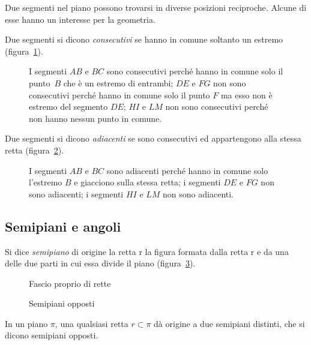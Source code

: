 Due segmenti nel piano possono trovarsi in diverse posizioni reciproche. Alcune di esse hanno un interesse per la geometria.
\begin{definizione}
Due segmenti si dicono \emph{consecutivi} se hanno in comune soltanto un estremo (figura~\ref{fig:1.14}).
\end{definizione}
\begin{figure}[b,t,h]
 \centering 
 \caption{I segmenti $ AB $ e $ BC $ sono consecutivi perché hanno in comune solo il punto~$ B $ che è un estremo di entrambi; $ DE $ e $ FG $ non sono consecutivi perché hanno in comune solo il punto $ F $ ma esso non è estremo del segmento $ DE $; $ HI $ e $ LM $ non sono consecutivi perché non hanno nessun punto in comune.}\label{fig:1.14}
\end{figure}

\begin{definizione}
Due segmenti si dicono \emph{adiacenti} se sono consecutivi ed appartengono alla stessa retta (figura~\ref{fig:1.15}).
\end{definizione}
\begin{figure}[t,b,h]
 \centering 
 \caption{I segmenti $ AB $ e $ BC $ sono adiacenti perché hanno in comune solo l'estremo $ B $ e giacciono sulla stessa retta; i segmenti $ DE $ e $ FG $ non sono adiacenti; i segmenti $ HI $ e $ LM $ non sono adiacenti.}\label{fig:1.15}
\end{figure}

\subsection{Semipiani e angoli}

\begin{definizione}
Si dice \emph{semipiano} di origine la retta r la figura formata dalla retta r e da una delle due parti in cui essa divide il piano (figura~\ref{fig:1.17}).
\end{definizione}
\begin{figure}[b,t,h]
 \begin{minipage}[b]{.40\textwidth}
 \centering
 \caption{Fascio proprio di rette}\label{fig:1.16}
 \end{minipage}\hfil
 \begin{minipage}[b]{.40\textwidth}
 \centering
  \caption{Semipiani opposti}\label{fig:1.17}
  \end{minipage}
\end{figure}
In un piano ${\pi}$, una qualsiasi retta $r \subset \pi$ dà origine a due semipiani distinti, che si dicono semipiani opposti.

